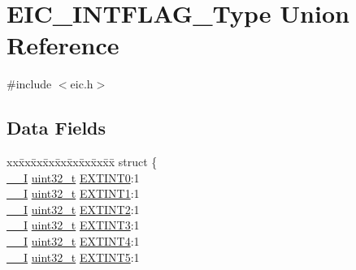 \hypertarget{union_e_i_c___i_n_t_f_l_a_g___type}{}\section{E\+I\+C\+\_\+\+I\+N\+T\+F\+L\+A\+G\+\_\+\+Type Union Reference}
\label{union_e_i_c___i_n_t_f_l_a_g___type}


{\ttfamily \#include $<$eic.\+h$>$}

\subsection*{Data Fields}
\begin{DoxyCompactItemize}
\item 
\begin{tabbing}
xx\=xx\=xx\=xx\=xx\=xx\=xx\=xx\=xx\=\kill
struct \{\\
\>\mbox{\hyperlink{core__cm0plus_8h_af63697ed9952cc71e1225efe205f6cd3}{\_\_I}} \mbox{\hyperlink{union_e_i_c___i_n_t_f_l_a_g___type_a7c2ec0f7b3f1314bdede58b182af397c}{uint32\_t}} \mbox{\hyperlink{union_e_i_c___i_n_t_f_l_a_g___type_aec48f77a484a654d95fb0c18b929c89c}{EXTINT0}}:1\\
\>\mbox{\hyperlink{core__cm0plus_8h_af63697ed9952cc71e1225efe205f6cd3}{\_\_I}} \mbox{\hyperlink{union_e_i_c___i_n_t_f_l_a_g___type_a7c2ec0f7b3f1314bdede58b182af397c}{uint32\_t}} \mbox{\hyperlink{union_e_i_c___i_n_t_f_l_a_g___type_a05c88e4bc61a002eca008f7f1a756e9e}{EXTINT1}}:1\\
\>\mbox{\hyperlink{core__cm0plus_8h_af63697ed9952cc71e1225efe205f6cd3}{\_\_I}} \mbox{\hyperlink{union_e_i_c___i_n_t_f_l_a_g___type_a7c2ec0f7b3f1314bdede58b182af397c}{uint32\_t}} \mbox{\hyperlink{union_e_i_c___i_n_t_f_l_a_g___type_a4d08e5e6fa54194c0db9031dee03b478}{EXTINT2}}:1\\
\>\mbox{\hyperlink{core__cm0plus_8h_af63697ed9952cc71e1225efe205f6cd3}{\_\_I}} \mbox{\hyperlink{union_e_i_c___i_n_t_f_l_a_g___type_a7c2ec0f7b3f1314bdede58b182af397c}{uint32\_t}} \mbox{\hyperlink{union_e_i_c___i_n_t_f_l_a_g___type_aa9ab7aea90f31b74871672b55b2eec65}{EXTINT3}}:1\\
\>\mbox{\hyperlink{core__cm0plus_8h_af63697ed9952cc71e1225efe205f6cd3}{\_\_I}} \mbox{\hyperlink{union_e_i_c___i_n_t_f_l_a_g___type_a7c2ec0f7b3f1314bdede58b182af397c}{uint32\_t}} \mbox{\hyperlink{union_e_i_c___i_n_t_f_l_a_g___type_addc3c339545109cf56455dfcc980222e}{EXTINT4}}:1\\
\>\mbox{\hyperlink{core__cm0plus_8h_af63697ed9952cc71e1225efe205f6cd3}{\_\_I}} \mbox{\hyperlink{union_e_i_c___i_n_t_f_l_a_g___type_a7c2ec0f7b3f1314bdede58b182af397c}{uint32\_t}} \mbox{\hyperlink{union_e_i_c___i_n_t_f_l_a_g___type_af13dd947a89b56b5342a8c23847456d7}{EXTINT5}}:1\\

\end{tabbing}
\end{DoxyCompactItemize}
